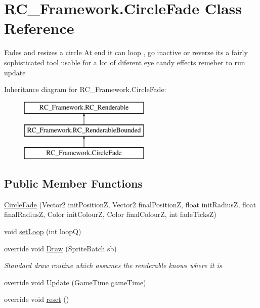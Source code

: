 \hypertarget{class_r_c___framework_1_1_circle_fade}{}\section{R\+C\+\_\+\+Framework.\+Circle\+Fade Class Reference}
\label{class_r_c___framework_1_1_circle_fade}


Fades and resizes a circle At end it can loop , go inactive or reverse its a fairly sophisticated tool usable for a lot of diferent eye candy effects remeber to run update  


Inheritance diagram for R\+C\+\_\+\+Framework.\+Circle\+Fade\+:\begin{figure}[H]
\begin{center}
\leavevmode
\includegraphics[height=3.000000cm]{class_r_c___framework_1_1_circle_fade}
\end{center}
\end{figure}
\subsection*{Public Member Functions}
\begin{DoxyCompactItemize}
\item 
\mbox{\hyperlink{class_r_c___framework_1_1_circle_fade_af5b020dad42c77795b9c92808f019dfe}{Circle\+Fade}} (Vector2 init\+PositionZ, Vector2 final\+PositionZ, float init\+RadiusZ, float final\+RadiusZ, Color init\+ColourZ, Color final\+ColourZ, int fade\+TicksZ)
\item 
void \mbox{\hyperlink{class_r_c___framework_1_1_circle_fade_a98d6a3fd33cbe0c616813a1bad1cf6b7}{set\+Loop}} (int loopQ)
\item 
override void \mbox{\hyperlink{class_r_c___framework_1_1_circle_fade_a75194b070e20dab4a4720c9ba43ae5ab}{Draw}} (Sprite\+Batch sb)
\begin{DoxyCompactList}\small\item\em Standard draw routine which assumes the renderable knows where it is \end{DoxyCompactList}\item 
override void \mbox{\hyperlink{class_r_c___framework_1_1_circle_fade_ade4928b94a3b49c0d3ffbd43d37060e6}{Update}} (Game\+Time game\+Time)
\item 
override void \mbox{\hyperlink{class_r_c___framework_1_1_circle_fade_a7dd68138bc5eb6e9e6f2d031d9091a8a}{reset}} ()
\end{DoxyCompactItemize}
